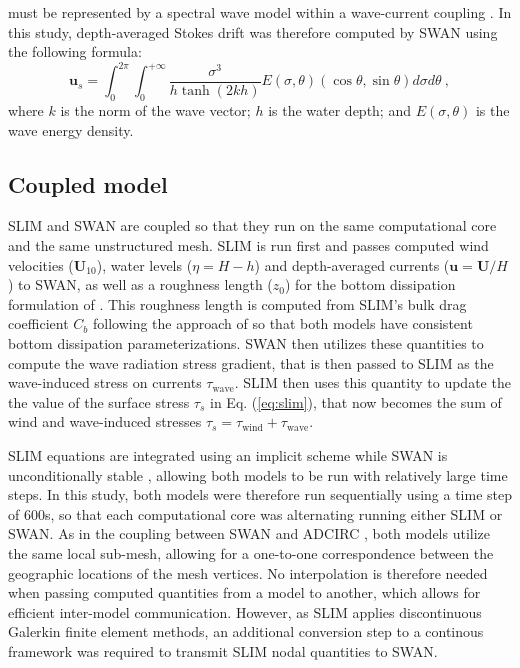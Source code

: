 \documentclass[11pt,a4paper]{article}
\begin{document}
must be represented by a spectral wave model within a wave-current coupling \citep{van2018stokes}. In this study, depth-averaged Stokes drift was therefore computed by SWAN using the following formula:
\begin{equation}
    \mathbf{u}_{s} = \int_0^{2\pi}\int_0^{+\infty} \dfrac{\sigma^3}{h\tanh(2kh)}E(\sigma,\theta)(\cos\theta, \sin\theta)d\sigma d\theta~, \label{eq:stokes}
\end{equation}
where $k$ is the norm of the wave vector; $h$ is the water depth; and $E(\sigma,\theta)$ is the wave energy density.

\subsection{Coupled model}

SLIM and SWAN are coupled so that they run on the same computational core and the same unstructured mesh. SLIM is run first and passes computed wind velocities ($\mathbf{U}_{10}$), water levels ($\eta=H-h$) and depth-averaged currents ($\mathbf{u}=\mathbf{U}/H$) to SWAN, as well as a roughness length ($z_0$) for the bottom dissipation formulation of \cite{madsen1989spectral}. This roughness length is computed from SLIM's bulk drag coefficient $C_b$ following the approach of \cite{dietrich2011hurricane} so that both models have consistent bottom dissipation parameterizations. SWAN then utilizes these quantities to compute the wave radiation stress gradient, that is then passed to SLIM as the wave-induced stress on currents {\boldmath$\tau$}$_\text{wave}$. SLIM then uses this quantity to update the the value of the surface stress {\boldmath$\tau$}$_s$ in Eq. (\ref{eq:slim}), that now becomes the sum of wind and wave-induced stresses {\boldmath$\tau$}$_s=${\boldmath$\tau$}$_\text{wind}+${\boldmath$\tau$}$_\text{wave}$.

SLIM equations are integrated using an implicit scheme while SWAN is unconditionally stable \citep{dietrich2010high}, allowing both models to be run with relatively large time steps. In this study, both models were therefore run sequentially using a time step of 600s, so that each computational core was alternating running either SLIM or SWAN. As in the coupling between SWAN and ADCIRC \citep{dietrich2010high}, both models utilize the same local sub-mesh, allowing for a one-to-one correspondence between the geographic locations of the mesh vertices. No interpolation is therefore needed when passing computed quantities from a model to another, which allows for efficient inter-model communication. However, as SLIM applies discontinuous Galerkin finite element methods, an additional conversion step to a continous framework was required to transmit SLIM nodal quantities to SWAN.  
\end{document}
